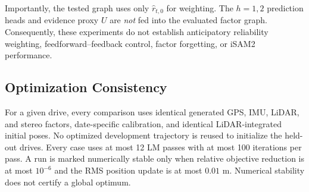 Importantly, the tested graph uses only
$\hat r_{t,0}$ for weighting. The $h=1,2$
prediction heads and evidence proxy $U$ are
\emph{not} fed into the evaluated factor graph.
Consequently, these experiments do not establish
anticipatory reliability weighting, feedforward--feedback
control, factor forgetting, or iSAM2 performance.

\subsection{Optimization Consistency}
For a given drive, every comparison uses identical
generated GPS, IMU, LiDAR, and stereo factors,
date-specific calibration, and identical
LiDAR-integrated initial poses. No optimized
development trajectory is reused to initialize
the held-out drives. Every case uses at most
12 LM passes with at most 100 iterations per pass.
A run is marked numerically stable only when
relative objective reduction is at most $10^{-6}$
and the RMS position update is at most $0.01$ m.
Numerical stability does not certify a global optimum.
